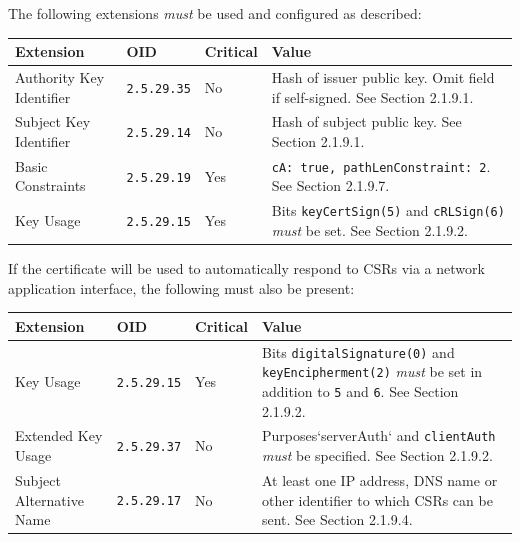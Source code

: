 The following extensions \textit{must} be used and configured as described:

\vspace*{0.5cm}
\noindent\begin{tabularx}{\textwidth}{| p{4cm} | p{2cm} | p{1.2cm} | X |} \hline
\rowcolor{gray!33} Extension & OID                & Critical & Value \\ \hline

Authority Key Identifier     & \texttt{2.5.29.35} & No       & Hash of issuer public key. Omit field if self-signed. See Section 2.1.9.1. \\ \hline
Subject Key Identifier       & \texttt{2.5.29.14} & No       & Hash of subject public key. See Section 2.1.9.1. \\ \hline
Basic Constraints            & \texttt{2.5.29.19} & Yes      & \texttt{cA: true, pathLenConstraint: 2}. See Section 2.1.9.7. \\ \hline
Key Usage                    & \texttt{2.5.29.15} & Yes      & Bits \texttt{keyCertSign(5)} and \texttt{cRLSign(6)} \textit{must} be set. See Section 2.1.9.2. \\ \hline

\end{tabularx}
\vspace*{0.5cm}

If the certificate will be used to automatically respond to CSRs via a network application interface, the following must also be present:

\vspace*{0.5cm}
\noindent\begin{tabularx}{\textwidth}{| p{4cm} | p{2cm} | p{1.2cm} | X |} \hline
\rowcolor{gray!33} Extension & OID                & Critical & Value \\ \hline

Key Usage                    & \texttt{2.5.29.15} & Yes      & Bits \texttt{digitalSignature(0)} and \texttt{keyEncipherment(2)} \textit{must} be set in addition to \texttt{5} and \texttt{6}. See Section 2.1.9.2. \\ \hline
Extended Key Usage           & \texttt{2.5.29.37} & No       & Purposes`serverAuth` and \texttt{clientAuth} \textit{must} be specified. See Section 2.1.9.2. \\ \hline
Subject Alternative Name     & \texttt{2.5.29.17} & No       & At least one IP address, DNS name or other identifier to which CSRs can be sent. See Section 2.1.9.4. \\ \hline

\end{tabularx}
\vspace*{0.5cm}

